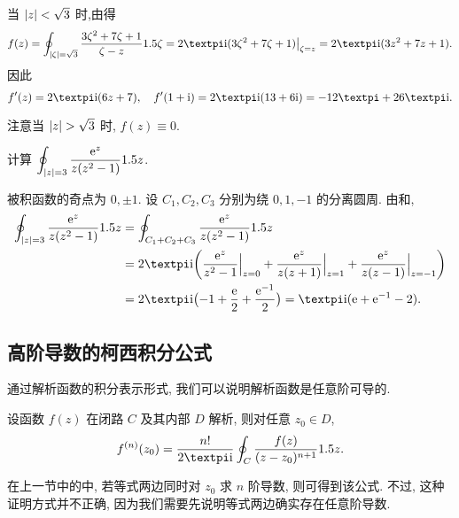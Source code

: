 \begin{solution}
  当 $\lvert z\rvert<\sqrt3$ 时,由\thmCI 得
  \[
     f(z)
    =\oint_{\abs{\zeta}=\sqrt3} \frac{3\zeta^2+7\zeta+1}{\zeta-z}\d \zeta
    =2\cpi\ii (3\zeta^2+7\zeta+1)\big|_{\zeta=z}
    =2\cpi\ii (3z^2+7z+1).
  \]
  因此
  \[
    f'(z)=2\cpi\ii (6z+7),\quad
     f'(1+\ii)
    =2\cpi\ii(13+6\ii)
    =-12\cpi+26\cpi\ii.
  \]
\end{solution}
注意当 $\lvert z\rvert>\sqrt3$ 时, $f(z)\equiv0$.

\begin{example}
  计算 $\displaystyle\oint_{\lvert z\rvert=3}\frac{\mathrm{e}^z}{z(z^2-1)}1.5 z$.
\end{example}

\begin{solution}
  被积函数的奇点为 $0,\pm1$.
  设 $C_1,C_2,C_3$ 分别为绕 $0,1,-1$ 的分离圆周.
  由\thmCCC 和\thmCI,
  \begin{align*}
      \oint_{\abs{z}=3}\frac{\ee^z}{z(z^2-1)}\d z&
    =\oint_{C_1+C_2+C_3}\frac{\ee^z}{z(z^2-1)}\d z\\&
    =2\cpi\ii \biggl(\frac{\ee^z}{z^2-1}\Big|_{z=0}
      +\frac{\ee^z}{z(z+1)}\Big|_{z=1}
      +\frac{\ee^z}{z(z-1)}\Big|_{z=-1}\biggr)\\&
    =2\cpi\ii \bigl(-1+\frac\ee2+\frac{\ee^{-1}}2\bigr)=\cpi\ii (\ee+\ee^{-1}-2).
  \end{align*}
\end{solution}


\subsection{高阶导数的柯西积分公式}

通过解析函数的积分表示形式, 我们可以说明\alert{解析函数是任意阶可导的}.

\begin{theorem}[柯西积分公式]
  \label{thm:Cauchy-integral-high-order}
  设函数 $f(z)$ 在闭路 $C$ 及其内部 $D$ 解析, 则对任意 $z_0\in D$,
  \[
    f^{(n)}(z_0)=\frac{n!}{2\cpi\ii}\oint_C \frac{f(z)}{(z-z_0)^{n+1}}\d z.
  \]
\end{theorem}

在上一节中的\thmCI 中, 若等式两边同时对 $z_0$ 求 $n$ 阶导数, 则可得到该公式.
不过, 这种证明方式并不正确, 因为我们需要先说明\thmCI 等式两边确实存在任意阶导数.

